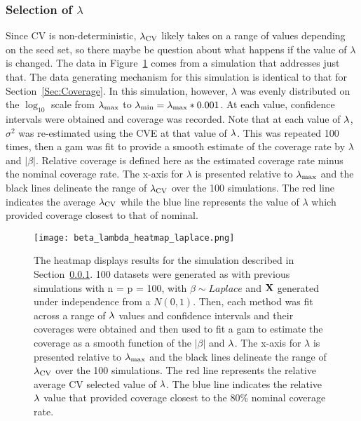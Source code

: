\subsubsection{Selection of \texorpdfstring{$\lambda$}{lambda}} \label{Sec:lambda}

Since CV is non-deterministic, $\lambda_{\textrm{CV}}$ likely takes on a range of values depending on the seed set, so there maybe be question about what happens if the value of $\lambda$ is changed. The data in Figure~\ref{Fig:beta_lambda_heatmap_laplace} comes from a simulation that addresses just that. The data generating mechanism for this simulation is identical to that for Section~\ref{Sec:Coverage}. In this simulation, however, $\lambda$ was evenly distributed on the $\log_{10}$ scale from $\lambda_{\max}$ to $\lambda_{\min} = \lambda_{\max} * 0.001$. At each value, confidence intervals were obtained and coverage was recorded. Note that at each value of $\lambda$, $\sigma^2$ was re-estimated using the CVE at that value of $\lambda$. This was repeated 100 times, then a gam was fit to provide a smooth estimate of the coverage rate by $\lambda$ and $|\beta|$. Relative coverage is defined here as the estimated coverage rate minus the nominal coverage rate. The x-axis for $\lambda$ is presented relative to $\lambda_{\max}$ and the black lines delineate the range of $\lambda_{\textrm{CV}}$ over the 100 simulations. The red line indicates the average $\lambda_{\textrm{CV}}$ while the blue line represents the value of $\lambda$ which provided coverage closest to that of nominal.

\begin{figure}[hbtp]
  \begin{center}
  \texttt{[image: beta\_lambda\_heatmap\_laplace.png]}
  \caption{\label{Fig:beta_lambda_heatmap_laplace} The heatmap displays results for the simulation described in Section~\ref{Sec:lambda}. 100 datasets were generated as with previous simulations with n = p = 100, with $\beta \sim Laplace$ and $\mathbf{X}$ generated under independence from a $N(0,1)$. Then, each method was fit across a range of $\lambda$ values and confidence intervals and their coverages were obtained and then used to fit a gam to estimate the coverage as a smooth function of the $|\beta|$ and $\lambda$. The x-axis for $\lambda$ is presented relative to $\lambda_{\max}$ and the black lines delineate the range of $\lambda_{\textrm{CV}}$ over the 100 simulations. The red line represents the relative average CV selected value of $\lambda$. The blue line indicates the relative $\lambda$ value that provided coverage closest to the 80\% nominal coverage rate.}
  \end{center}
\end{figure}

